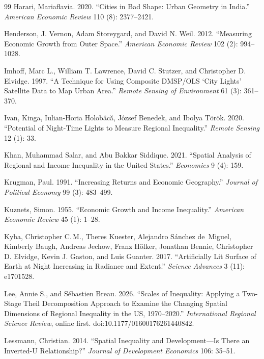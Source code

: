 \documentclass[11pt,a4paper]{article}
\begin{document}
\begin{thebibliography}{99}
Harari, Mariaflavia. 2020. ``Cities in Bad Shape: Urban Geometry in India.'' \textit{American Economic Review} 110 (8): 2377--2421.

Henderson, J. Vernon, Adam Storeygard, and David N. Weil. 2012. ``Measuring Economic Growth from Outer Space.'' \textit{American Economic Review} 102 (2): 994--1028.

Imhoff, Marc L., William T. Lawrence, David C. Stutzer, and Christopher D. Elvidge. 1997. ``A Technique for Using Composite DMSP/OLS `City Lights' Satellite Data to Map Urban Area.'' \textit{Remote Sensing of Environment} 61 (3): 361--370.

Ivan, Kinga, Iulian-Horia Holob\^ac\u{a}, J\'ozsef Benedek, and Ibolya T\"or\"ok. 2020. ``Potential of Night-Time Lights to Measure Regional Inequality.'' \textit{Remote Sensing} 12 (1): 33.

Khan, Muhammad Salar, and Abu Bakkar Siddique. 2021. ``Spatial Analysis of Regional and Income Inequality in the United States.'' \textit{Economies} 9 (4): 159.

Krugman, Paul. 1991. ``Increasing Returns and Economic Geography.'' \textit{Journal of Political Economy} 99 (3): 483--499.

Kuznets, Simon. 1955. ``Economic Growth and Income Inequality.'' \textit{American Economic Review} 45 (1): 1--28.

Kyba, Christopher C.\,M., Theres Kuester, Alejandro S\'anchez de~Miguel, Kimberly Baugh, Andreas Jechow, Franz H\"olker, Jonathan Bennie, Christopher D. Elvidge, Kevin J. Gaston, and Luis Guanter. 2017. ``Artificially Lit Surface of Earth at Night Increasing in Radiance and Extent.'' \textit{Science Advances} 3 (11): e1701528.

Lee, Annie S., and S\'ebastien Breau. 2026. ``Scales of Inequality: Applying a Two-Stage Theil Decomposition Approach to Examine the Changing Spatial Dimensions of Regional Inequality in the US, 1970--2020.'' \textit{International Regional Science Review}, online first. doi:10.1177/01600176261440842.

Lessmann, Christian. 2014. ``Spatial Inequality and Development---Is There an Inverted-U Relationship?'' \textit{Journal of Development Economics} 106: 35--51.


\end{thebibliography}
\end{document}
